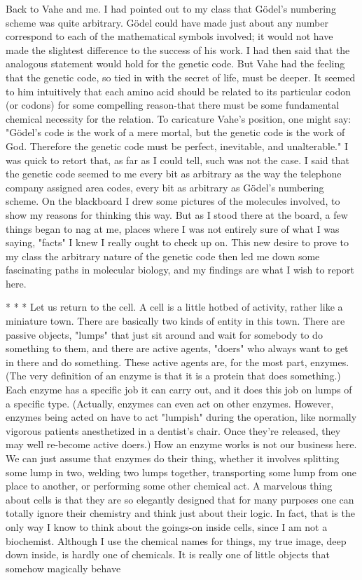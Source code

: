 Back to Vahe and me. I had pointed out to my class that Gödel’s numbering scheme
was quite arbitrary. Gödel could have made just about any number correspond to each
of the mathematical symbols involved; it would not have made the slightest difference
to the success of his work. I had then said that the analogous statement would hold for
the genetic code. But Vahe had the feeling that the genetic code, so tied in with the
secret of life, must be deeper. It seemed to him intuitively that each amino acid should
be related to its particular codon (or codons) for some compelling reason-that there
must be some fundamental chemical necessity for the relation. To caricature Vahe's
position, one might say: "Gödel’s code is the work of a mere mortal, but the genetic
code is the work of God. Therefore the genetic code must be perfect, inevitable, and
unalterable."
        I was quick to retort that, as far as I could tell, such was not the case. I said
that the genetic code seemed to me every bit as arbitrary as the way the telephone
company assigned area codes, every bit as arbitrary as Gödel’s numbering scheme.
On the blackboard I drew some pictures of the molecules involved, to show my
reasons for thinking this way. But as I stood there at the board, a few things began to
nag at me, places where I was not entirely sure of what I was saying, "facts" I knew I
really ought to check up on. This new desire to prove to my class the arbitrary nature
of the genetic code then led me down some fascinating paths in molecular biology,
and my findings are what I wish to report here.

                                       *    *    *
        Let us return to the cell. A cell is a little hotbed of activity, rather like a
miniature town. There are basically two kinds of entity in this town. There are passive
objects, "lumps" that just sit around and wait for somebody to do something to them,
and there are active agents, "doers" who always want to get in there and do
something. These active agents are, for the most part, enzymes. (The very definition
of an enzyme is that it is a protein that does something.) Each enzyme has a specific
job it can carry out, and it does this job on lumps of a specific type. (Actually,
enzymes can even act on other enzymes. However, enzymes being acted on have to
act "lumpish" during the operation, like normally vigorous patients anesthetized in a
dentist's chair. Once they're released, they may well re-become active doers.) How an
enzyme works is not our business here. We can just assume that enzymes do their
thing, whether it involves splitting some lump in two, welding two lumps together,
transporting some lump from one place to another, or performing some other
chemical act.
        A marvelous thing about cells is that they are so elegantly designed that for
many purposes one can totally ignore their chemistry and think just about their logic.
In fact, that is the only way I know to think about the goings-on inside cells, since I
am not a biochemist. Although I use the chemical names for things, my true image,
deep down inside, is hardly one of chemicals. It is really one of little objects that
somehow magically behave




